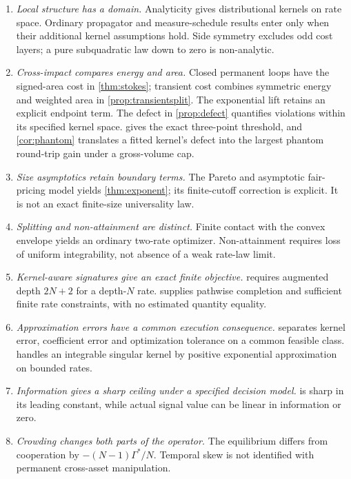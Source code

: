 \documentclass[11pt]{article}
\numberwithin{equation}{section}
\theoremstyle{definition}
\theoremstyle{remark}
\theoremstyle{definition}
\begin{document}
\begin{enumerate}
\item \emph{Local structure has a domain.} Analyticity gives distributional
 kernels on rate space. Ordinary propagator and measure-schedule results enter
 only when their additional kernel assumptions hold. Side symmetry excludes
 odd cost layers; a pure subquadratic law down to zero is non-analytic.
\item \emph{Cross-impact compares energy and area.} Closed permanent loops
 have the signed-area cost in \cref{thm:stokes}; transient cost combines
 symmetric energy and weighted area in \cref{prop:transientsplit}.
 The exponential lift retains an explicit endpoint term.
 The defect in \cref{prop:defect} quantifies violations within its
 specified kernel space.  gives the exact three-point
 threshold, and \cref{cor:phantom} translates a fitted kernel's defect into
 the largest phantom round-trip gain under a gross-volume cap.
\item \emph{Size asymptotics retain boundary terms.} The Pareto and
 asymptotic fair-pricing model yields \cref{thm:exponent}; its finite-cutoff
 correction is explicit. It is not an exact finite-size universality law.
\item \emph{Splitting and non-attainment are distinct.} Finite contact with
 the convex envelope yields an ordinary two-rate optimizer. Non-attainment
 requires loss of uniform integrability, not absence of a weak rate-law limit.
\item \emph{Kernel-aware signatures give an exact finite objective.}
  requires augmented depth $2N+2$ for a depth-$N$
 rate.  supplies pathwise completion and sufficient
 finite rate constraints, with no estimated quantity equality.
\item \emph{Approximation errors have a common execution consequence.}
  separates kernel error, coefficient error and
 optimization tolerance on a common feasible class.
  handles an integrable singular kernel by positive
 exponential approximation on bounded rates.
\item \emph{Information gives a sharp ceiling under a specified decision model.}
  is sharp in its leading constant, while actual
 signal value can be linear in information or zero.
\item \emph{Crowding changes both parts of the operator.} The equilibrium
 differs from cooperation by $-(N-1)\Gamma^*/N$. Temporal skew is not
 identified with permanent cross-asset manipulation.
\end{enumerate}
\end{document}

